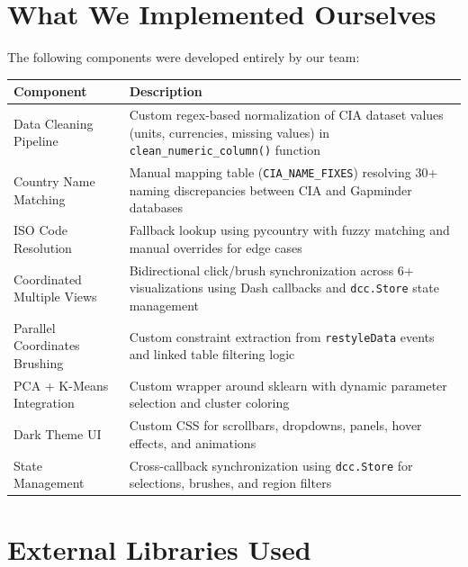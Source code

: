 \documentclass[11pt]{article}
\begin{document}
\section{What We Implemented Ourselves}

The following components were developed entirely by our team:

\begin{table}[H]
\centering
\begin{tabular}{@{}p{4cm}p{9cm}@{}}
\toprule
\textbf{Component} & \textbf{Description} \\
\midrule
Data Cleaning Pipeline & Custom regex-based normalization of CIA dataset values (units, currencies, missing values) in \texttt{clean\_numeric\_column()} function \\
\addlinespace
Country Name Matching & Manual mapping table (\texttt{CIA\_NAME\_FIXES}) resolving 30+ naming discrepancies between CIA and Gapminder databases \\
\addlinespace
ISO Code Resolution & Fallback lookup using pycountry with fuzzy matching and manual overrides for edge cases \\
\addlinespace
Coordinated Multiple Views & Bidirectional click/brush synchronization across 6+ visualizations using Dash callbacks and \texttt{dcc.Store} state management \\
\addlinespace
Parallel Coordinates Brushing & Custom constraint extraction from \texttt{restyleData} events and linked table filtering logic \\
\addlinespace
PCA + K-Means Integration & Custom wrapper around sklearn with dynamic parameter selection and cluster coloring \\
\addlinespace
Dark Theme UI & Custom CSS for scrollbars, dropdowns, panels, hover effects, and animations \\
\addlinespace
State Management & Cross-callback synchronization using \texttt{dcc.Store} for selections, brushes, and region filters \\
\bottomrule
\end{tabular}
\end{table}

\section{External Libraries Used}
\end{document}
